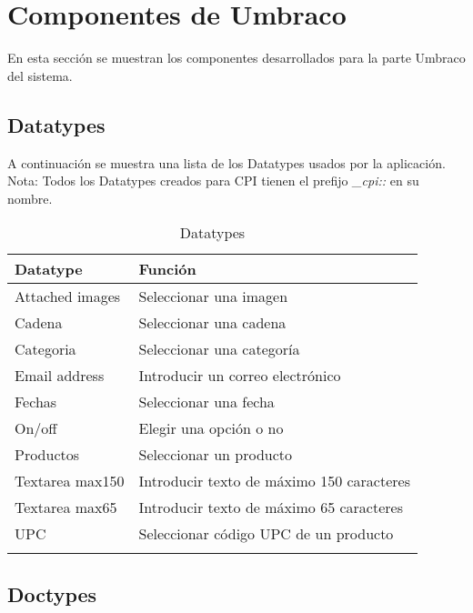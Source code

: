 \vskip 2cm
\section{Componentes de Umbraco} \label{componentesUmbraco}
En esta sección se muestran los componentes desarrollados para la parte Umbraco del sistema.

\subsection{Datatypes}
A continuación se muestra una lista de los Datatypes usados por la aplicación.
Nota: Todos los Datatypes creados para CPI tienen el prefijo \emph{\_cpi::} en su nombre.

\begin{longtable}{  l | l  }
   \hline\hline
   \rowcolor{blue!25}
   \textbf{Datatype} & \textbf{Función} \\
   \hline\hline
   \endhead

   \hline
   \endfoot

   \endlastfoot

   Attached images & Seleccionar una imagen \\
   Cadena & Seleccionar una cadena \\
   Categoria & Seleccionar una categoría \\
   Email address & Introducir un correo electrónico \\
   Fechas & Seleccionar una fecha \\
   On/off & Elegir una opción o no \\
   Productos & Seleccionar un producto \\
   Textarea max150 & Introducir texto de máximo 150 caracteres \\
   Textarea max65 & Introducir texto de máximo 65 caracteres \\
   UPC & Seleccionar código UPC de un producto \\
   \hline

   \caption{Datatypes}
   \label{table:datatypes}
\end{longtable}


\subsection{Doctypes}


